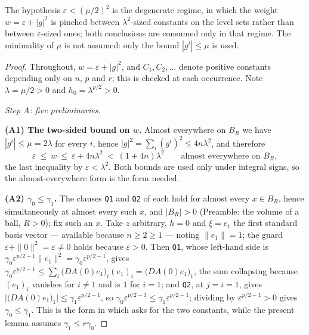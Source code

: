 \begin{lemma}
The hypothesis $\varepsilon<(\mu/2)^2$ is the degenerate regime, in which the
weight $w=\varepsilon+|g|^2$ is pinched between $\lambda^2$-sized constants on
the level sets rather than between $\varepsilon$-sized ones; both conclusions
are consumed only in that regime.  The minimality of $\mu$ is not assumed: only
the bound $|g^i|\le\mu$ is used.
\end{lemma}
\begin{proof}
Throughout, $w=\varepsilon+|g|^2$, and $C_1,C_2,\dots$ denote positive
constants depending only on $n$, $p$ and $r$; this is checked at each
occurrence.  Note $\lambda=\mu/2>0$ and $h_0=\lambda^{p/2}>0$.

\emph{Step A: five preliminaries.}

\textbf{(A1) The two-sided bound on $w$.}  Almost everywhere on $B_R$ we have
$|g^i|\le\mu=2\lambda$ for every $i$, hence
$|g|^2=\sum_i(g^i)^2\le 4n\lambda^2$, and therefore
\[
\varepsilon\ \le\ w\ \le\ \varepsilon+4n\lambda^2\ <\ (1+4n)\lambda^2
\qquad\text{almost everywhere on }B_R,
\tag{A.1}
\]
the last inequality by $\varepsilon<\lambda^2$.  Both bounds are used only under
integral signs, so the almost-everywhere form is the form needed.

\textbf{(A2) $\gamma_0\le\gamma_1$.}  The clauses \texttt{Q1} and \texttt{Q2} of
 each hold for almost every $x\in B_R$, hence
simultaneously at almost every such $x$, and $|B_R|>0$ (Preamble: the volume of
a ball, $R>0$); fix such an $x$.  Take $z$ arbitrary, $h=0$ and $\xi=e_1$ the
first standard basis vector --- available because $n\ge2\ge1$ --- noting
$\|e_1\|=1$; the guard
$\varepsilon+\|0\|^2=\varepsilon\ne0$ holds because $\varepsilon>0$.  Then
\texttt{Q1}, whose left-hand side is
$\gamma_0\varepsilon^{p/2-1}\|e_1\|^2=\gamma_0\varepsilon^{p/2-1}$, gives
$\gamma_0\varepsilon^{p/2-1}\le\sum_i\bigl(DA(0)e_1\bigr)_i(e_1)_i
=\bigl(DA(0)e_1\bigr)_1$, the sum collapsing because $(e_1)_i$ vanishes for
$i\ne1$ and is $1$ for $i=1$; and \texttt{Q2}, at $j=i=1$, gives
$\bigl|\bigl(DA(0)e_1\bigr)_1\bigr|\le\gamma_1\varepsilon^{p/2-1}$, so
$\gamma_0\varepsilon^{p/2-1}\le\gamma_1\varepsilon^{p/2-1}$; dividing by
$\varepsilon^{p/2-1}>0$ gives $\gamma_0\le\gamma_1$.  This is the form in which
 asks for the two constants, while the
present lemma assumes $\gamma_1\le r\gamma_0$.


\end{proof}
